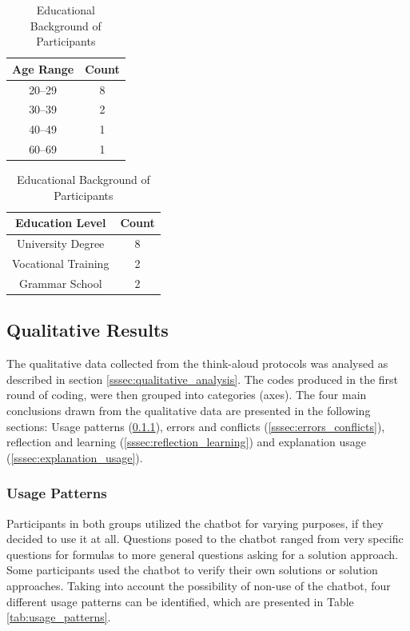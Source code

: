 \begingroup
\tablespacing

\begin{table}[ht]
    \parbox{.45\linewidth}{
        \centering
        \begin{tabular}{cc}
            Age Range & Count \\
            \hline
            20--29 & 8 \\
            30--39 & 2 \\
            40--49 & 1 \\
            60--69 & 1
        \end{tabular}
        \caption{Age Distribution of Participants}
        \label{tab:age_dist}
    }
    \hfill
    \parbox{.45\linewidth}{
        \begin{tabular}{cc}
            Education Level & Count \\
            \hline
            University Degree & 8 \\
            Vocational Training & 2 \\
            Grammar School & 2
        \end{tabular}
        \caption{Educational Background of Participants}
        \label{tab:edu_bg}
    }
\end{table}

\endgroup

\subsection{Qualitative Results} \label{ssec:qual_results}

The qualitative data collected from the think-aloud protocols was analysed as described in section \ref{sssec:qualitative_analysis}. The codes produced in the first round of coding, were then grouped into categories (axes). The four main conclusions drawn from the qualitative data are presented in the following sections: Usage patterns (\ref{sssec:usage_patterns}), errors and conflicts (\ref{sssec:errors_conflicts}), reflection and learning (\ref{sssec:reflection_learning}) and explanation usage (\ref{sssec:explanation_usage}).

\subsubsection{Usage Patterns} \label{sssec:usage_patterns}

Participants in both groups utilized the chatbot for varying purposes, if they decided to use it at all. Questions posed to the chatbot ranged from very specific questions for formulas to more general questions asking for a solution approach. Some participants used the chatbot to verify their own solutions or solution approaches. Taking into account the possibility of non-use of the chatbot, four different usage patterns can be identified, which are presented in Table \ref{tab:usage_patterns}.

